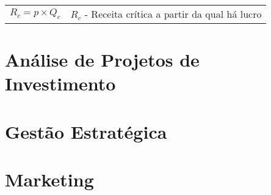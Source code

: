 \documentclass[11pt]{article}
\begin{document}
\begin{tabular}{ c c }
    \begin{minipage}{0.45\textwidth}
        \begin{equation*}
            R_c = p \times Q_c
        \end{equation*}
    \end{minipage} &
    \begin{minipage}{0.45\textwidth}
        $R_c$ - Receita crítica a partir da qual há lucro
    \end{minipage}
\end{tabular}

\newpage

\section{Análise de Projetos de Investimento}

\section{Gestão Estratégica}

\section{Marketing}
\end{document}
